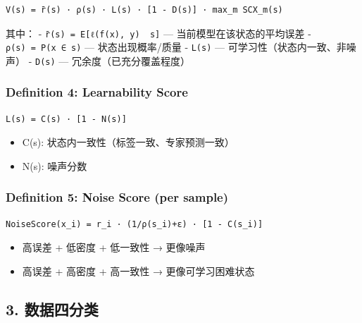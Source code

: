 \documentclass[
  12pt,
]{ctexart}
\providecommand{\tightlist}{%
  \setlength{\itemsep}{0pt}\setlength{\parskip}{0pt}}
\begin{document}
\begin{verbatim}
V(s) = r̄(s) · ρ(s) · L(s) · [1 - D(s)] · max_m SCX_m(s)
\end{verbatim}

其中： - \texttt{r̄(s)\ =\ E{[}ℓ(f(x),\ y)\ \textbar{}\ s{]}} ---
当前模型在该状态的平均误差 - \texttt{ρ(s)\ =\ P(x\ ∈\ s)} ---
状态出现概率/质量 - \texttt{L(s)} --- 可学习性（状态内一致、非噪声） -
\texttt{D(s)} --- 冗余度（已充分覆盖程度）

\subsubsection{Definition 4: Learnability
Score}\label{definition-4-learnability-score}

\begin{verbatim}
L(s) = C(s) · [1 - N(s)]
\end{verbatim}

\begin{itemize}
\tightlist
\item
  C(s): 状态内一致性（标签一致、专家预测一致）
\item
  N(s): 噪声分数
\end{itemize}

\subsubsection{Definition 5: Noise Score (per
sample)}\label{definition-5-noise-score-per-sample}

\begin{verbatim}
NoiseScore(x_i) = r_i · (1/ρ(s_i)+ε) · [1 - C(s_i)]
\end{verbatim}

\begin{itemize}
\tightlist
\item
  高误差 + 低密度 + 低一致性 → 更像噪声
\item
  高误差 + 高密度 + 高一致性 → 更像可学习困难状态
\end{itemize}

\subsection{3. 数据四分类}\label{ux6570ux636eux56dbux5206ux7c7b}
\end{document}
